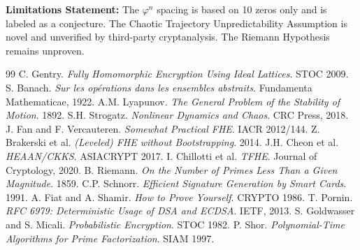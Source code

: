 \documentclass{article}
\begin{document}
\textbf{Limitations Statement:} The $\varphi^n$ spacing is based on 10 zeros only and is labeled as a conjecture. The Chaotic Trajectory Unpredictability Assumption is novel and unverified by third-party cryptanalysis. The Riemann Hypothesis remains unproven.

\begin{thebibliography}{99}
 C. Gentry. \textit{Fully Homomorphic Encryption Using Ideal Lattices}. STOC 2009.
 S. Banach. \textit{Sur les op\'erations dans les ensembles abstraits}. Fundamenta Mathematicae, 1922.
 A.M. Lyapunov. \textit{The General Problem of the Stability of Motion}. 1892.
 S.H. Strogatz. \textit{Nonlinear Dynamics and Chaos}. CRC Press, 2018.
 J. Fan and F. Vercauteren. \textit{Somewhat Practical FHE}. IACR 2012/144.
 Z. Brakerski et al. \textit{(Leveled) FHE without Bootstrapping}. 2014.
 J.H. Cheon et al. \textit{HEAAN/CKKS}. ASIACRYPT 2017.
 I. Chillotti et al. \textit{TFHE}. Journal of Cryptology, 2020.
 B. Riemann. \textit{On the Number of Primes Less Than a Given Magnitude}. 1859.
 C.P. Schnorr. \textit{Efficient Signature Generation by Smart Cards}. 1991.
 A. Fiat and A. Shamir. \textit{How to Prove Yourself}. CRYPTO 1986.
 T. Pornin. \textit{RFC 6979: Deterministic Usage of DSA and ECDSA}. IETF, 2013.
 S. Goldwasser and S. Micali. \textit{Probabilistic Encryption}. STOC 1982.
 P. Shor. \textit{Polynomial-Time Algorithms for Prime Factorization}. SIAM 1997.
\end{thebibliography}
\end{document}
